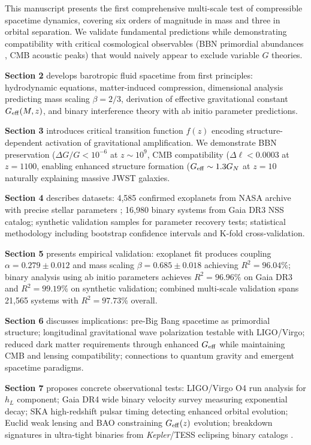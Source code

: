\documentclass[10pt,a4paper]{article}
\begin{document}
This manuscript presents the first comprehensive multi-scale test of
compressible spacetime dynamics, covering six orders of magnitude in
mass and three in orbital separation. We validate fundamental
predictions while demonstrating compatibility with critical cosmological
observables (BBN primordial abundances \cite{Pitrou2018}, CMB acoustic peaks) that would
naively appear to exclude variable \(G\) theories.

\textbf{Section 2} develops barotropic fluid spacetime from first
principles: hydrodynamic equations, matter-induced compression,
dimensional analysis predicting mass scaling \(\beta = 2/3\), derivation
of effective gravitational constant \(G_{\rm eff}(M,z)\), and binary
interference theory with ab initio parameter predictions.

\textbf{Section 3} introduces critical transition function \(f(z)\)
encoding structure-dependent activation of gravitational amplification.
We demonstrate BBN preservation (\(\Delta G/G < 10^{-6}\) at
\(z \sim 10^9\), CMB compatibility (\(\Delta\ell < 0.0003\) at
\(z=1100\), enabling enhanced structure formation
(\(G_{\rm eff} \sim 1.3 G_N\) at \(z=10\) naturally explaining massive
JWST galaxies.

\textbf{Section 4} describes datasets: 4,585 confirmed exoplanets from
NASA archive with precise stellar parameters \cite{Bruntt2010}; 16,980 binary systems from
Gaia DR3 NSS catalog; synthetic validation samples for parameter
recovery tests; statistical methodology including bootstrap confidence
intervals and K-fold cross-validation.

\textbf{Section 5} presents empirical validation: exoplanet fit produces
coupling \(\alpha = 0.279 \pm 0.012\) and mass scaling
\(\beta = 0.685 \pm 0.018\) achieving \(R^2 = 96.04\%\); binary analysis
using ab initio parameters achieves \(R^2 = 96.96\%\) on Gaia DR3 and
\(R^2 = 99.19\%\) on synthetic validation; combined multi-scale
validation spans 21,565 systems with \(R^2 = 97.73\%\) overall.

\textbf{Section 6} discusses implications: pre-Big Bang spacetime as
primordial structure; longitudinal gravitational wave polarization
testable with LIGO/Virgo; reduced dark matter requirements through
enhanced \(G_{\rm eff}\) while maintaining CMB and lensing
compatibility; connections to quantum gravity and emergent spacetime
paradigms.

\textbf{Section 7} proposes concrete observational tests: LIGO/Virgo O4
run analysis for \(h_L\) component; Gaia DR4 wide binary velocity survey
measuring exponential decay; SKA high-redshift pulsar timing detecting
enhanced orbital evolution; Euclid weak lensing and BAO constraining
\(G_{\rm eff}(z)\) evolution; breakdown signatures in ultra-tight
binaries from \emph{Kepler}/TESS eclipsing binary catalogs \cite{ref45}.
\end{document}
